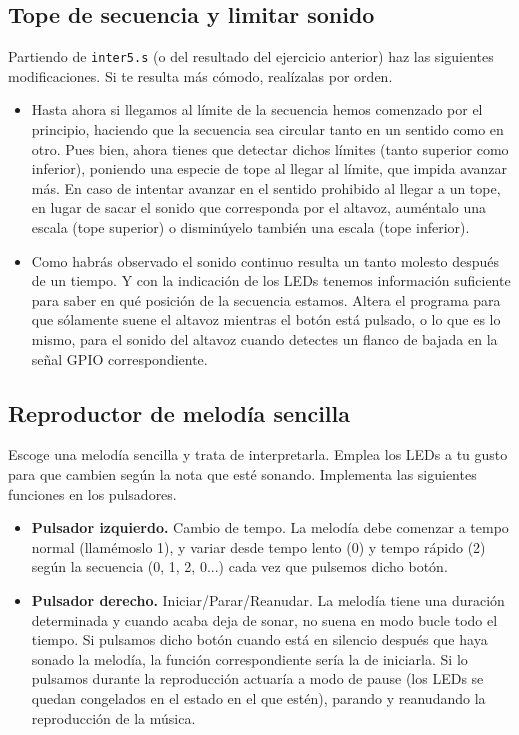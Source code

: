 \subsection{Tope de secuencia y limitar sonido}

Partiendo de {\tt inter5.s} (o del resultado del ejercicio anterior) haz las siguientes
modificaciones. Si te resulta más cómodo, realízalas por orden.

\begin{itemize}
  \item Hasta ahora si llegamos al límite de la secuencia hemos comenzado por el principio,
        haciendo que la secuencia sea circular tanto en un sentido como en otro. Pues bien,
        ahora tienes que detectar dichos límites (tanto superior como inferior), poniendo
        una especie de tope al llegar al límite, que impida avanzar más. En caso de intentar
        avanzar en el sentido prohibido al llegar a un tope, en lugar de sacar el sonido que
        corresponda por el altavoz, auméntalo una escala (tope superior) o disminúyelo también
        una escala (tope inferior).
  \item Como habrás observado el sonido continuo resulta un tanto molesto después de un tiempo.
        Y con la indicación de los LEDs tenemos información suficiente para saber en qué
        posición de la secuencia estamos. Altera el programa para que sólamente suene el altavoz
        mientras el botón está pulsado, o lo que es lo mismo, para el sonido del altavoz cuando
        detectes un flanco de bajada en la señal GPIO correspondiente.
\end{itemize}

\subsection{Reproductor de melodía sencilla}

Escoge una melodía sencilla y trata de interpretarla. Emplea los LEDs a tu gusto para que
cambien según la nota que esté sonando. Implementa las siguientes funciones en los pulsadores.

\begin{itemize}
  \item \textbf{Pulsador izquierdo.} Cambio de tempo. La melodía debe comenzar a tempo normal (llamémoslo 1),
        y variar desde tempo lento (0) y tempo rápido (2) según la secuencia (0, 1, 2, 0...) cada
        vez que pulsemos dicho botón.
  \item \textbf{Pulsador derecho.} Iniciar/Parar/Reanudar. La melodía tiene una duración determinada y
        cuando acaba deja de sonar, no suena en modo bucle todo el tiempo. Si pulsamos dicho botón
        cuando está en silencio después que haya sonado la melodía, la función correspondiente
        sería la de iniciarla. Si lo pulsamos durante la reproducción actuaría a modo de pause
        (los LEDs se quedan congelados en el estado en el que estén), parando y reanudando la
        reproducción de la música.
\end{itemize}

